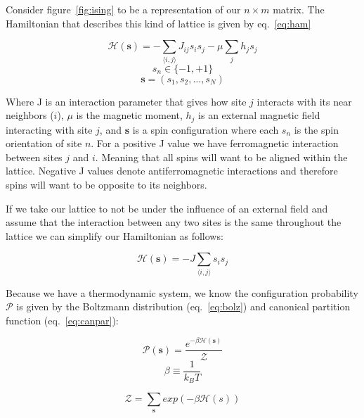 \documentclass[a4]{scrartcl}
\begin{document}
Consider figure~\ref{fig:ising} to be a representation of our $ n \times m $ matrix. The
Hamiltonian that describes this kind of lattice is given by eq.~\eqref{eq:ham}

\begin{equation} \label{eq:ham}
\mathcal{H}(\textbf{s}) = - \sum_{\langle i, j \rangle} J_{ij} s_{i} s_{j} -
	\mu \sum_{j} h_j s_j
\end{equation}
{\scriptsize \begin{equation*}
s_{n} \in \{-1,+1\}
\end{equation*}}\vspace{-.5cm}
\begin{equation*}
\textbf{s} = (s_{1}, s_{2}, \dots, s_{N})
\end{equation*}
 
Where J is an interaction parameter that gives how site $ j $ interacts with
its near neighbors ($ i $), $\mu$ is the magnetic moment, $h_j$ is an external
magnetic field interacting with site $ j $, and \textbf{s} is a spin
configuration where each $s_n$ is the spin orientation of site $n$. For a
positive J value we have ferromagnetic interaction between sites $ j $ and $ i
$. Meaning that all spins will want to be aligned within the lattice. Negative
J values denote antiferromagnetic interactions and therefore spins will want to
be opposite to its neighbors.

If we take our lattice to not be under the influence of an external field and
assume that the interaction between any two sites is the same throughout the
lattice we can simplify our Hamiltonian as follows:
 
\begin{equation}
\mathcal{H}(\textbf{s}) = -J \sum_{\langle i, j \rangle} s_{i} s_{j}
\end{equation}

Because we have a thermodynamic system, we know the configuration probability $
\mathcal{P} $ is given by the Boltzmann distribution (eq.~\eqref{eq:bolz}) and
canonical partition function (eq.~\eqref{eq:canpar}):

\begin{equation}\label{eq:bolz}
	\mathcal{P}(\textbf{s}) = \frac{e^{-\beta \mathcal{H}(\textbf{s})}}
		{\mathcal{Z}}
\end{equation}
{\scriptsize \begin{equation*}
	\beta \equiv \frac{1}{k_{B} T}
\end{equation*}}

\begin{equation}\label{eq:canpar}
\mathcal{Z} = \sum_{\textbf{s}} exp(-\beta \mathcal{H}(s))
\end{equation}
\end{document}
